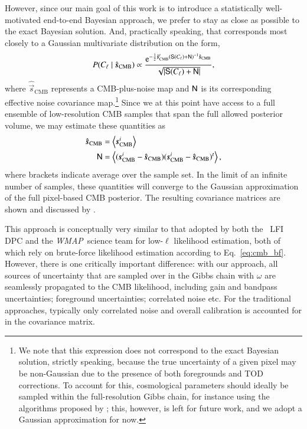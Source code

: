 \documentclass[onecolumn]{aa}
\def\WMAP{\emph{WMAP}}
\newcommand{\s}[0]{\vec{s}}
\newcommand{\N}[0]{\tens{N}}
\renewcommand{\S}[0]{\tens{S}}
\newcommand{\e}{\mathrm e}
\begin{document}
However, since our main goal of this work is to introduce a
statistically well-motivated end-to-end Bayesian approach, we prefer to stay as
close as possible to the exact Bayesian solution. And, practically
speaking, that corresponds most closely to a Gaussian multivariate
distribution on the form,
\begin{equation}
P(C_{\ell}\mid \hat{\s}_{\mathrm{CMB}}) \propto
\frac{\e^{-\frac{1}{2}\hat{\s}^t_{\mathrm{CMB}}\left(\S(C_{\ell}) +
  \N\right)^{-1}\hat{\s}_{\mathrm{CMB}}}}{\sqrt{|\S(C_{\ell})+\N|}},
\label{eq:cmb_bf}
\end{equation}
where $\hat{\s}_{\mathrm{CMB}}$ represents a CMB-plus-noise map and $\N$ is its
corresponding effective noise covariance map.\footnote{We note that this
  expression does not correspond to the exact Bayesian solution,
  strictly speaking, because the true uncertainty of a given pixel may
  be non-Gaussian due to the presence of both foregrounds and TOD
  corrections. To account for this, cosmological parameters should
  ideally be sampled within the full-resolution Gibbs chain, for
  instance using the algorithms proposed by \citet{racine:2016}; this,
  however, is left for future work, and we adopt a Gaussian
  approximation for now.} Since we at this point have access to a
full ensemble of low-resolution CMB samples that span the full allowed
posterior volume, we may estimate these quantities as 
\begin{align}
  \hat{\s}_{\mathrm{CMB}} &= \left<\s_{\mathrm{CMB}}^i\right>\\
  \N &=
  \left<(\s^i_{\mathrm{CMB}}-\hat{\s}_{\mathrm{CMB}})(\s^i_{\mathrm{CMB}}-\hat{\s}_{\mathrm{CMB}})^t\right>,
  \label{eq:cmb_lowl_input}
\end{align}
where brackets indicate average over the sample set. In the limit of
an infinite number of samples, these quantities will converge to the
Gaussian approximation of the full pixel-based CMB posterior. The
resulting covariance matrices are shown and discussed by \citet{bp11}.

This approach is conceptually very similar to that adopted by both the
\Planck\ LFI DPC \citet{planck2016-l05} and the \WMAP\ science team
\citet{hinshaw2012} for low-$\ell$ likelihood estimation, both of
which rely on brute-force likelihood estimation according to
Eq.~\eqref{eq:cmb_bf}. However, there is one critically important
difference: with our approach, all sources of uncertainty that are
sampled over in the Gibbs chain with $\omega$ are seamlessly
propagated to the CMB likelihood, including gain and bandpass
uncertainties; foreground uncertainties; correlated noise etc. For the
traditional approaches, typically only correlated noise and overall
calibration is accounted for in the covariance matrix.
\end{document}
